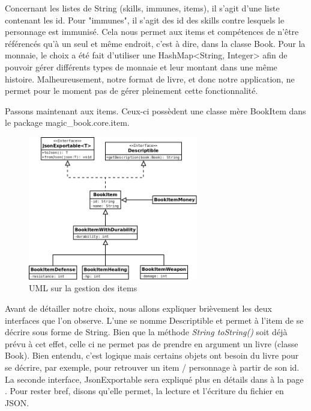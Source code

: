 			Concernant les listes de String (skills, immunes, items), il s'agit d'une liste contenant les id. Pour "immunes", il s'agit des id des skills contre lesquels le personnage est immunisé. Cela nous permet aux items et compétences de n'être référencés qu'à un seul et même endroit, c'est à dire, dans la classe Book. Pour la monnaie, le choix a été fait d'utiliser une HashMap<String, Integer> afin de pouvoir gérer différents types de monnaie et leur montant dans une même histoire. Malheureusement, notre format de livre, et donc notre application, ne permet pour le moment pas de gérer pleinement cette fonctionnalité.

			Passons maintenant aux items. Ceux-ci possèdent une classe mère BookItem dans le package magic\_book.core.item.

			\begin{figure}[H]
				\centering\includegraphics[width=0.66\textwidth, keepaspectratio]{img/book_item.png}
				\caption{UML sur la gestion des items}
			\end{figure}

			Avant de détailler notre choix, nous allons expliquer brièvement les deux interfaces que l'on observe. L'une se nomme Descriptible et permet à l'item de se décrire sous forme de String. Bien que la méthode \textit{String toString()} soit déjà prévu à cet effet, celle ci ne permet pas de prendre en argument un livre (classe Book). Bien entendu, c'est logique mais certains objets ont besoin du livre pour se décrire, par exemple, pour retrouver un item / personnage à partir de son id. La seconde interface, JsonExportable sera expliqué plus en détails dans  à la page \pageref{subsec:lecture_ecriture_fichier}. Pour rester bref, disons qu'elle permet, la lecture et l'écriture du fichier en JSON.

